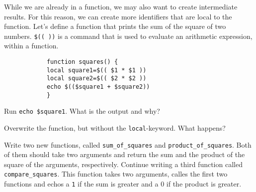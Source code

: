\begin{challenge}
    \begin{task}
        While we are already in a function, we may also want to create intermediate results.
        For this reason, we can create more identifiers that are local to the function.
        Let's define a function that prints the sum of the square of two numbers.
        \texttt{\$(( ))} is a command that is used to evaluate an arithmetic expression, within a function.
        \begin{lstlisting}
            function squares() {
            local square1=$(( $1 * $1 ))
            local square2=$(( $2 * $2 ))
            echo $(($square1 + $square2))
            }
        \end{lstlisting}
        \begin{questions}
            \item Run \texttt{echo \$square1}. What is the output and why?
            \item Overwrite the function, but without the \texttt{local}-keyword. What happens?
            \item Write two new functions, called \texttt{sum_of_squares} and \texttt{product_of_squares}. Both of them should take two arguments and return the sum and the product of the square of the arguments, respectively. Continue writing a third function called \texttt{compare_squares}. This function takes two arguments, calles the first two functions and echos a \texttt{1} if the sum is greater and a 0 if the product is greater.
        \end{questions}
    \end{task}
\end{challenge}
    
